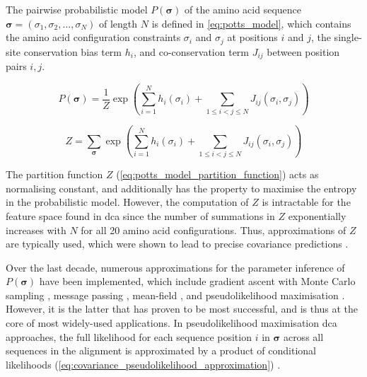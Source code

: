 The pairwise probabilistic model $P(\boldsymbol{\sigma})$ of the amino acid sequence $\boldsymbol{\sigma}=\left(\sigma_1,\sigma_2,\dots,\sigma_N\right)$ of length $N$ is defined in \cref{eq:potts_model}, which contains the amino acid configuration constraints $\sigma_i$ and $\sigma_j$ at positions $i$ and $j$, the single-site conservation bias term $h_i$, and co-conservation term $J_{ij}$ between position pairs $i,j$. 

\begin{equation}
    P(\boldsymbol{\sigma})=\frac{1}{Z}\exp\left(\sum_{i=1}^{N}h_i\left(\sigma_i\right)+\sum_{1 \leqslant i < j \leqslant N}J_{ij}\left(\sigma_i, \sigma_j\right)\right)
    \label{eq:potts_model}
\end{equation}

\begin{equation}
    Z=\sum_{\boldsymbol{\sigma}}^{ }\exp\left(\sum_{i=1}^{N}h_i\left(\sigma_i\right)+\sum_{1 \leqslant i < j \leqslant N}J_{ij}\left(\sigma_i, \sigma_j\right)\right)
    \label{eq:potts_model_partition_function}
\end{equation}

The partition function $Z$ (\cref{eq:potts_model_partition_function}) acts as normalising constant, and additionally has the property to maximise the entropy in the probabilistic model. However, the computation of $Z$ is intractable for the feature space found in \gls{dca} since the number of summations in $Z$ exponentially increases with $N$ for all 20 amino acid configurations. Thus, approximations of $Z$ are typically used, which were shown to lead to precise covariance predictions \cite{Ekeberg2013-ay}.

Over the last decade, numerous approximations for the parameter inference of $P(\boldsymbol{\sigma})$ have been implemented, which include gradient ascent with Monte Carlo sampling \cite{Lapedes2012-tu}, message passing \cite{Weigt2009-sx}, mean-field \cite{Marks2011-os,Morcos2011-lk,Jones2012-ks,Stein2015-cw}, and pseudolikelihood maximisation \cite{Balakrishnan2011-wh,Ekeberg2013-ay,Kamisetty2013-le,Seemayer2014-zp,Hopf2015-vf}. However, it is the latter that has proven to be most successful, and is thus at the core of most widely-used applications. In pseudolikelihood maximisation \gls{dca} approaches, the full likelihood for each sequence position $i$ in $\boldsymbol{\sigma}$ across all sequences in the alignment is approximated by a product of conditional likelihoods (\cref{eq:covariance_pseudolikelihood_approximation}) \cite{Hopf2017-pp}.

